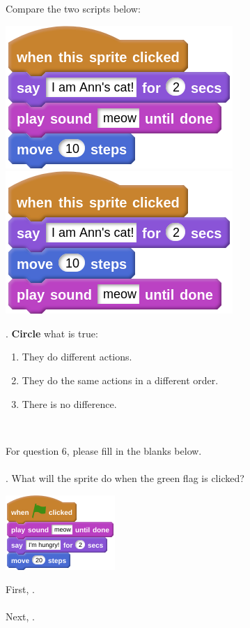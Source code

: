 \documentclass[letterpaper,12pt]{article}
\begin{document}
\noindent Compare the two scripts below:
\begin{center}
\includegraphics[scale=.4,valign=t]{q5_script0.png} \hspace{0.5in}
\includegraphics[scale=.4,valign=t]{q5_script1.png}
\end{center}

. \textbf{Circle} what is true:
\renewcommand{\theenumi}{\Alph{enumi}}
\begin{enumerate}
\item They do different actions. 
\item They do the same actions in a different order.
\item There is no difference.
\end{enumerate}
\noindent \dotfill \\

\newpage

\noindent For question 6, please fill in the blanks below. \\ \\
. What will the sprite do when the green flag is clicked?
\begin{center}
\includegraphics[scale=1]{q6_script0.png}
\end{center}
\noindent First, \hrulefill . \\ \\
Next, \hrulefill . \\ \\
\end{document}
